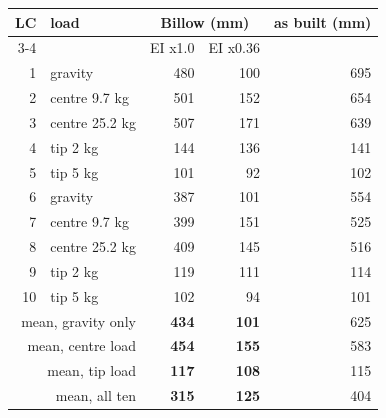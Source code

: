 \begin{tabular}{rl rrr}
\toprule
LC & load & \multicolumn{2}{c}{Billow (mm)} & as built (mm) \\
\cmidrule(lr){3-4}
 & & EI x1.0 & EI x0.36 & \\
\midrule
1 & gravity & 480 & 100 & 695 \\
2 & centre 9.7 kg & 501 & 152 & 654 \\
3 & centre 25.2 kg & 507 & 171 & 639 \\
4 & tip 2 kg & 144 & 136 & 141 \\
5 & tip 5 kg & 101 & 92 & 102 \\
6 & gravity & 387 & 101 & 554 \\
7 & centre 9.7 kg & 399 & 151 & 525 \\
8 & centre 25.2 kg & 409 & 145 & 516 \\
9 & tip 2 kg & 119 & 111 & 114 \\
10 & tip 5 kg & 102 & 94 & 101 \\
\midrule
\multicolumn{2}{r}{mean, gravity only} & \textbf{434} & \textbf{101} & 625 \\
\multicolumn{2}{r}{mean, centre load} & \textbf{454} & \textbf{155} & 583 \\
\multicolumn{2}{r}{mean, tip load} & \textbf{117} & \textbf{108} & 115 \\
\multicolumn{2}{r}{mean, all ten} & \textbf{315} & \textbf{125} & 404 \\
\bottomrule
\end{tabular}